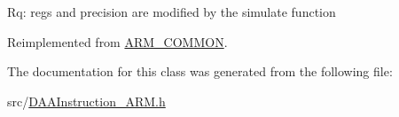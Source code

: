 Rq\+: regs and precision are modified by the simulate function 

Reimplemented from \hyperlink{classARM__COMMON_a89eb552311ce787557a976aee2fa2db6}{A\+R\+M\+\_\+\+C\+O\+M\+M\+ON}.



The documentation for this class was generated from the following file\+:\begin{DoxyCompactItemize}
\item 
src/\hyperlink{DAAInstruction__ARM_8h}{D\+A\+A\+Instruction\+\_\+\+A\+R\+M.\+h}\end{DoxyCompactItemize}
